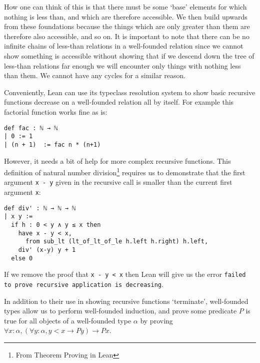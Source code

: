 \documentclass{article}
\renewcommand{\a}{\alpha}
\newcommand{\ct}{\texttt}
\begin{document}
How one can think of this is that there must be some `base' elements for which nothing is less than, and which are therefore accessible.
We then build upwards from these foundations because the things which are only greater than them are therefore also accessible, and so on.
It is important to note that there can be no infinite chains of less-than relations in a well-founded relation since we cannot show something is accessible without showing that if we descend down the tree of less-than relations far enough we will encounter only things with nothing less than them. %
We cannot have any cycles for a similar reason.

Conveniently, Lean can use its typeclass resolution system to show basic recursive functions decrease on a well-founded relation all by itself. For example this factorial function works fine as is:
\begin{lstlisting}
def fac : ℕ → ℕ
| 0 := 1
| (n + 1)  := fac n * (n+1)
\end{lstlisting}
However, it needs a bit of help for more complex recursive functions.
This definition of natural number division\footnote{From Theorem Proving in Lean} requires us to demonstrate that the first argument \ct{x - y} given in the recursive call is smaller than the current first argument \ct{x}:
\begin{lstlisting}
def div' : ℕ → ℕ → ℕ
| x y :=
  if h : 0 < y ∧ y ≤ x then
    have x - y < x,
      from sub_lt (lt_of_lt_of_le h.left h.right) h.left,
    div' (x-y) y + 1
  else 0
\end{lstlisting}
If we remove the proof that \ct{x - y < x} then Lean will give us the error \ct{failed to prove recursive application is decreasing}.

In addition to their use in showing recursive functions `terminate', well-founded types allow us to perform well-founded induction, and prove some predicate $P$ is true for all objects of a well-founded type $\a$ by proving $\forall x : \a, (\forall y:\a, y < x \to P y) \to P x$.
\end{document}
